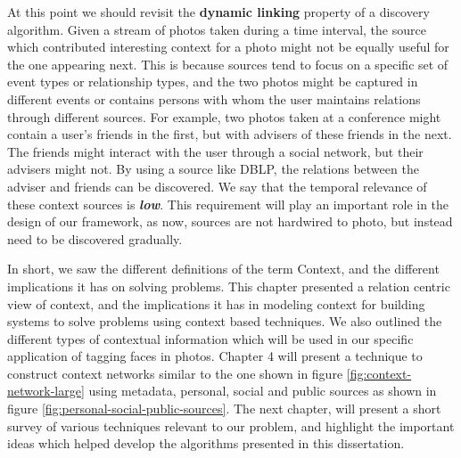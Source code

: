 At this point we should revisit the \textbf{dynamic linking} property of a discovery algorithm. Given a stream of photos taken during a time interval, the source which contributed interesting context for a photo might not be equally useful for the one appearing next. This is because sources tend to focus on a specific set of event types or relationship types, and the two photos might be captured in different events or contains persons with whom the user maintains relations through different sources. For example, two photos taken at a conference might contain a user's friends in the first, but with advisers of these friends in the next. The friends might interact with the user through a social network, but their advisers might not. By using a source like DBLP, the relations between the adviser and friends can be discovered. We say that the temporal relevance of these context sources is \textbf{\textit{low}}. This requirement will play an important role in the design of our framework, as now, sources are not hardwired to photo, but instead need to be discovered gradually.

In short, we saw the different definitions of the term Context, and the different implications it has on solving problems. This chapter presented a relation centric view of context, and the implications it has in modeling context for building systems to solve problems using context based techniques. We also outlined the different types of contextual information which will be used in our specific application of tagging faces in photos. Chapter 4 will present a technique to construct context networks similar to the one shown in figure \ref{fig:context-network-large} using metadata, personal, social and public sources as shown in figure \ref{fig:personal-social-public-sources}. The next chapter, will present a short survey of various techniques relevant to our problem, and highlight the important ideas which helped develop the algorithms presented in this dissertation.




